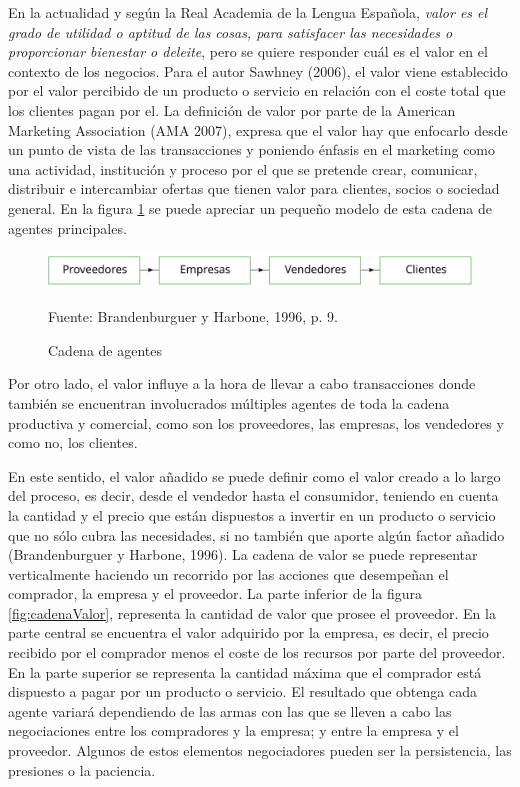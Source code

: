 En la actualidad y según la Real Academia de la Lengua Española, \emph{valor es el grado de utilidad o aptitud de las cosas, para satisfacer las necesidades o proporcionar bienestar o deleite}, pero se quiere responder cuál es el valor en el contexto de los negocios. Para el autor Sawhney (2006), el valor viene establecido por el valor percibido de un producto o servicio en relación con el coste total que los clientes pagan por el. La definición de valor por parte de la American Marketing Association (AMA 2007), expresa que el valor hay que enfocarlo desde un punto de vista de las transacciones y poniendo énfasis en el marketing como una actividad, institución y proceso por el que se pretende crear, comunicar, distribuir e intercambiar ofertas que tienen valor para clientes, socios o sociedad general. En la figura \ref{fig:cadenaAgentesPorter} se puede apreciar un pequeño modelo de esta cadena de agentes principales.

\begin{figure}[!h]
	\caption{Cadena de agentes}
	\centering \includegraphics[width=150mm]{capitulos/graficos/cadenaAgentesPorter}
	\label{fig:cadenaAgentesPorter}

		\footnotesize
		Fuente: Brandenburguer y Harbone, 1996, p. 9.
\end{figure}



Por otro lado, el valor influye a la hora de llevar a cabo transacciones donde también se encuentran involucrados múltiples agentes de toda la cadena productiva y comercial, como son los proveedores, las empresas, los vendedores y como no, los clientes.  

En este sentido, el valor añadido se puede definir como el valor creado a lo largo del proceso, es decir, desde el vendedor hasta el consumidor, teniendo en cuenta la cantidad y el precio que están dispuestos a invertir en un producto o servicio que no sólo cubra las necesidades, si no también que aporte algún factor añadido (Brandenburguer y Harbone, 1996). La cadena de valor se puede representar verticalmente haciendo un recorrido por las acciones que desempeñan el comprador, la empresa y el proveedor. La parte inferior de la figura \ref{fig:cadenaValor}, representa la cantidad de valor que prosee el proveedor. En la parte central se encuentra el valor adquirido por la empresa, es decir, el precio recibido por el comprador menos el coste de los recursos por parte del proveedor. En la parte superior se representa la cantidad máxima que el comprador está dispuesto a pagar por un producto o servicio. El resultado que obtenga cada agente variará dependiendo de las armas con las que se lleven a cabo las negociaciones entre los compradores y la empresa; y entre la empresa y el proveedor. Algunos de estos elementos negociadores pueden ser la persistencia, las presiones o la paciencia.

